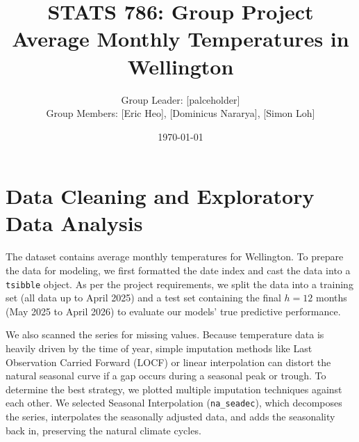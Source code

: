 \documentclass[11pt, a4paper]{article}\usepackage[]{graphicx}\usepackage[]{xcolor}
\title{\textbf{STATS 786: Group Project} \\ Average Monthly Temperatures in Wellington}
\author{
  Group Leader: [palceholder] \\
  Group Members: [Eric Heo], [Dominicus Nararya], [Simon Loh]
}
\date{\today}
\begin{document}
\maketitle



\tableofcontents
\newpage

\section{Data Cleaning and Exploratory Data Analysis}

The dataset contains average monthly temperatures for Wellington. To prepare the data for modeling, we first formatted the date index and cast the data into a \texttt{tsibble} object. As per the project requirements, we split the data into a training set (all data up to April 2025) and a test set containing the final $h=12$ months (May 2025 to April 2026) to evaluate our models' true predictive performance. 

We also scanned the series for missing values. Because temperature data is heavily driven by the time of year, simple imputation methods like Last Observation Carried Forward (LOCF) or linear interpolation can distort the natural seasonal curve if a gap occurs during a seasonal peak or trough. To determine the best strategy, we plotted multiple imputation techniques against each other. We selected Seasonal Interpolation (\texttt{na\_seadec}), which decomposes the series, interpolates the seasonally adjusted data, and adds the seasonality back in, preserving the natural climate cycles.
\end{document}

